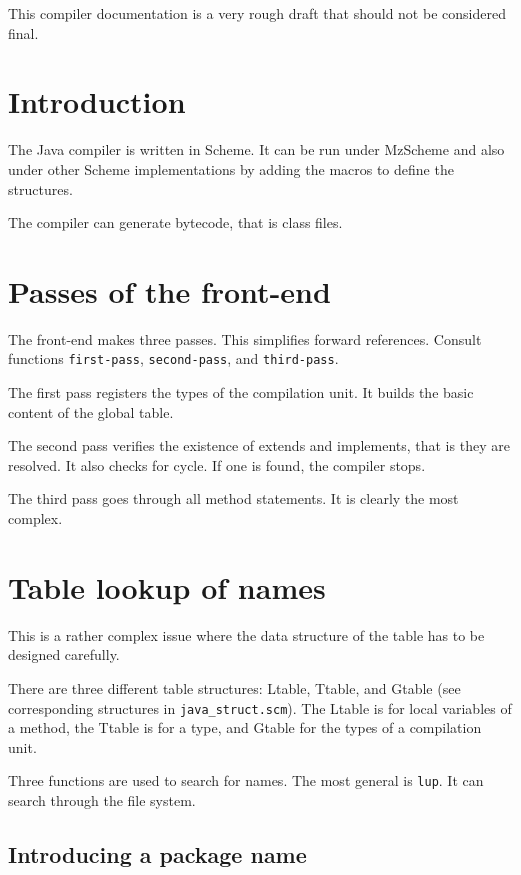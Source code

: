 \documentclass{book}
\newcommand{\func}[1]{\verb+#1+}
\newcommand{\file}[1]{\verb+#1+}
\begin{document}
{\Large This compiler documentation is a very rough draft that should
not be considered final.}

\section{Introduction}

The Java compiler is written in Scheme. It can be run under MzScheme
and also under other Scheme implementations by adding the macros to
define the structures.

The compiler can generate bytecode, that is class files.

\section{Passes of the front-end}

The front-end makes three passes. This simplifies forward references.
Consult functions \func{first-pass}, \func{second-pass}, and
\func{third-pass}.

The first pass registers the types of the compilation unit. It builds
the basic content of the global table.

The second pass verifies the existence of extends and implements, that
is they are resolved. It also checks for cycle. If one is found, the
compiler stops.

The third pass goes through all method statements. It is clearly the
most complex.

\section{Table lookup of names}

This is a rather complex issue where the data structure of the table
has to be designed carefully. 

There are three different table structures: Ltable, Ttable, and Gtable
(see corresponding structures in \file{java_struct.scm}). The Ltable
is for local variables of a method, the Ttable is for a type, and
Gtable for the types of a compilation unit.

Three functions are used to search for names. The most general is
\func{lup}. It can search through the file system. 

\subsection{Introducing a package name}
\end{document}
